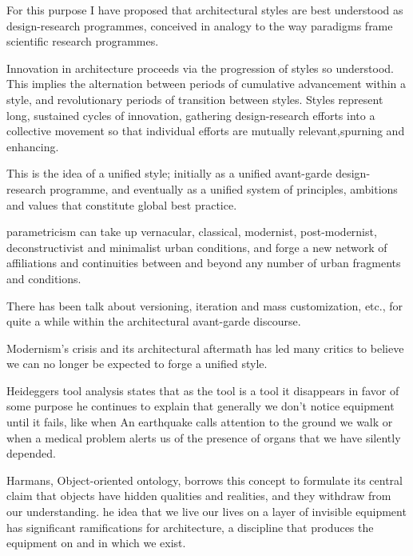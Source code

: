 For this purpose I have proposed that architectural styles are best understood as design-research programmes, conceived in analogy to the way paradigms frame scientific research programmes. \cite{Schumacher2010}


Innovation in architecture proceeds via the progression of styles so understood.
This implies the alternation between periods of cumulative advancement within a style, and revolutionary periods of transition between styles.
Styles represent long, sustained cycles of innovation, gathering design-research efforts into a collective movement so that individual efforts are mutually relevant,spurning and enhancing.\cite{Schumacher2010}

This is the idea of a unified style;
initially as a unified avant-garde design-research programme, and eventually as a unified system of principles, ambitions and values that constitute global best practice.\cite{Schumacher2010}


parametricism can take up vernacular, classical, modernist, post-modernist, deconstructivist and minimalist urban conditions, and forge a new network of affiliations and continuities between and beyond any number of urban fragments and conditions. \cite{Schumacher2010}


There has been talk about versioning, iteration and mass customization, etc., for quite a while within the architectural avant-garde discourse. \cite{Schumacher2008}

Modernism’s crisis and its architectural aftermath has led many critics to believe we can no longer be expected to forge a unified style.\cite{Schumacher2010}

Heideggers tool analysis states that as the tool is a tool it disappears in favor of some purpose he continues to explain that generally we don't notice equipment until it fails, like when An earthquake calls attention to the ground we walk or when a medical problem alerts us of the presence of organs that we have silently depended\cite{Harman2011}.

Harmans, Object-oriented ontology, borrows this concept to formulate its central claim that objects have hidden qualities and realities, and they withdraw from our understanding.\cite{Gage2015}
he idea that we live our lives on a layer of invisible equipment has significant ramifications for architecture, a discipline that produces the equipment on and in which we exist.\cite{Gage2015}

